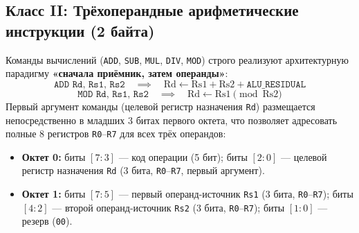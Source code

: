 \documentclass[11pt,a4paper]{article}
\newcommand{\reg}[1]{\texttt{#1}}
\newcommand{\bits}[1]{\texttt{#1}}
\begin{document}
\subsection{Класс II: Трёхоперандные арифметические инструкции (2 байта)}
Команды вычислений (\texttt{ADD}, \texttt{SUB}, \texttt{MUL}, \texttt{DIV}, \texttt{MOD}) строго реализуют архитектурную парадигму \textbf{«сначала приёмник, затем операнды»}:
$$\texttt{ADD Rd, Rs1, Rs2} \quad \implies \quad \text{Rd} \leftarrow \text{Rs1} + \text{Rs2} + \reg{ALU\_RESIDUAL}$$
$$\texttt{MOD Rd, Rs1, Rs2} \quad \implies \quad \text{Rd} \leftarrow \text{Rs1} \pmod{\text{Rs2}}$$
Первый аргумент команды (целевой регистр назначения \reg{Rd}) размещается непосредственно в младших 3 битах первого октета, что позволяет адресовать полные 8 регистров \texttt{R0}--\texttt{R7} для всех трёх операндов:
\begin{itemize}
  \item \textbf{Октет 0:} биты $[7:3]$ --- код операции (5 бит); биты $[2:0]$ --- целевой регистр назначения \reg{Rd} (3 бита, \texttt{R0}--\texttt{R7}, первый аргумент).
  \item \textbf{Октет 1:} биты $[7:5]$ --- первый операнд-источник \reg{Rs1} (3 бита, \texttt{R0}--\texttt{R7}); биты $[4:2]$ --- второй операнд-источник \reg{Rs2} (3 бита, \texttt{R0}--\texttt{R7}); биты $[1:0]$ --- резерв (\bits{00}).
\end{itemize}
\end{document}
